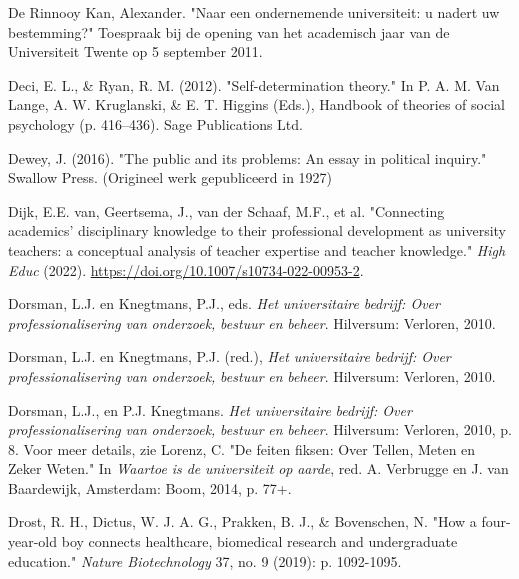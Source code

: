 \documentclass[smallauthor, chapterhaspagenum, nochapterinheader, pagenuminheader,  bigchapnum,medium2, tocpages,  garamond, titleinheader]{jote-book}
\begin{document}
\begin{references}
		De Rinnooy Kan, Alexander. "Naar een ondernemende universiteit: u nadert uw bestemming?" Toespraak bij de opening van het academisch jaar van de Universiteit Twente op 5 september 2011.



		Deci, E. L., \& Ryan, R. M. (2012). "Self-determination theory." In P. A. M. Van Lange, A. W. Kruglanski, \& E. T. Higgins (Eds.), Handbook of theories of social psychology (p. 416--436). Sage Publications Ltd.



		Dewey, J. (2016). "The public and its problems: An essay in political inquiry." Swallow Press. (Origineel werk gepubliceerd in 1927)



		Dijk, E.E. van, Geertsema, J., van der Schaaf, M.F., et al. "Connecting academics' disciplinary knowledge to their professional development as university teachers: a conceptual analysis of teacher expertise and teacher knowledge." \emph{High Educ} (2022). \href{https://doi.org/10.1007/s10734-022-00953-2}{https://doi.org/10.1007/s10734-022-00953-2}.



		Dorsman, L.J. en Knegtmans, P.J., eds. \emph{Het }\emph{universitaire}\emph{ }\emph{bedrijf}\emph{: Over }\emph{professionalisering}\emph{ van }\emph{onderzoek}\emph{, }\emph{bestuur}\emph{ }\emph{en}\emph{ }\emph{beheer}. Hilversum: Verloren, 2010.



		Dorsman, L.J. en Knegtmans, P.J. (red.), \emph{Het }\emph{universitaire}\emph{ }\emph{bedrijf}\emph{: Over }\emph{professionalisering}\emph{ van }\emph{onderzoek}\emph{, }\emph{bestuur}\emph{ }\emph{en}\emph{ }\emph{beheer}. Hilversum: Verloren, 2010.



		Dorsman, L.J., en P.J. Knegtmans. \emph{Het }\emph{universitaire}\emph{ }\emph{bedrijf}\emph{: Over }\emph{professionalisering}\emph{ van }\emph{onderzoek}\emph{, }\emph{bestuur}\emph{ }\emph{en}\emph{ }\emph{beheer}. Hilversum: Verloren, 2010, p. 8. Voor meer details, zie Lorenz, C. "De feiten fiksen: Over Tellen, Meten en Zeker Weten." In \emph{Waartoe}\emph{ is de }\emph{universiteit}\emph{ op }\emph{aarde}, red. A. Verbrugge en J. van Baardewijk, Amsterdam: Boom, 2014, p. 77+.



		Drost, R. H., Dictus, W. J. A. G., Prakken, B. J., \& Bovenschen, N. "How a four-year-old boy connects healthcare, biomedical research and undergraduate education." \emph{Nature Biotechnology} 37, no. 9 (2019): p. 1092-1095.




\end{references}
\end{document}
